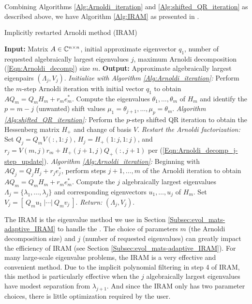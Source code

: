 Combining Algorithms \ref{Alg:Arnoldi_iteration} and \ref{Alg:shifted_QR_iteration} as described above, we have Algorithm \ref{Alg:IRAM} as presented in \cite[Section 10.5.3]{golub2012matrix}.

\begin{algorithm}[H]
\caption{Implicitly restarted Arnoldi method (IRAM)}	\label{Alg:IRAM}

\begin{algorithmic}[1]
	\Statex 	\textbf{Input:} Matrix $A \in {\mathbb C}^{n \times n}$, initial approximate eigenvector $q_1$, number of requested algebraically largest eigenvalues $j$, maximum Arnoldi decomposition (\ref{Eqn:Arnoldi_decomp}) size $m$.
	\Statex 	\textbf{Output:} Approximate algebraically largest eigenpairs $(\Lambda_j, V_j)$.
	\State		\textit{Initialize with Algorithm \ref{Alg:Arnoldi_iteration}:} Perform the $m$-step Arnoldi iteration with initial vector $q_1$ to obtain $AQ_m = Q_m H_m + r_m e_m^*$.
		\State		Compute the eigenvalues $\theta_1, \ldots , \theta_m$ of $H_m$ and identify the $p = m-j$ (unwanted) shift values $\mu_1 = \theta_{j+1},  \ldots, \mu_p = \theta_m$.
		\State		\textit{Algorithm \ref{Alg:shifted_QR_iteration}:}  Perform the $p$-step shifted QR iteration to obtain the Hessenberg matrix $H_+$ and change of basis $V$.
		\State		\textit{Restart the Arnoldi factorization:} Set 
		$Q_j = Q_mV(:, 1:j)$,
		$H_j = H_+(1:j, 1:j)$,
		and $r_j = V(m,j)r_m + H_+(j+1,j)Q_+(:,j+1)$ per (\ref{Eqn:Arnoldi_decomp_j-step_update}).
		\State		\textit{Algorithm \ref{Alg:Arnoldi_iteration}:}  Beginning with $AQ_j = Q_jH_j + r_je_j^*$, perform steps $j+1, \ldots, m$ of the Arnoldi iteration to obtain $AQ_m = Q_m H_m + r_m e_m^*$.
	\EndWhile
	\State 		Compute the $j$ algebraically largest eigenvalues $\Lambda_j = \{ \lambda_1, \ldots, \lambda_j\}$ and corresponding eigenvectors $u_1, \ldots, u_j$ of $H_m$.  Set $V_j = [ \ Q_m u_1 \ | \cdots | \ Q_m v_j \ ]$.
	\State		\textit{Return:} $(\Lambda_j, V_j)$.
\end{algorithmic}

\end{algorithm}


The IRAM is the eigenvalue method we use in Section \ref{Subsec:evol_mats-adaptive_IRAM} to handle the \emep.  The choice of parameters $m$ (the Arnoldi decomposition size) and $j$ (number of requested eigenvalues) can greatly impact the efficiency of IRAM (see Section \ref{Subsec:evol_mats-adaptive_IRAM}).  For many large-scale eigenvalue problems, the IRAM is a very effective and convenient method.  Due to the implicit polynomial filtering in step 4 of IRAM, this method is particularly effective when the $j$ algebraically largest eigenvalues have modest separation from $\lambda_{j+1}$.  And since the IRAM only has two parameter choices, there is little optimization required by the user.

